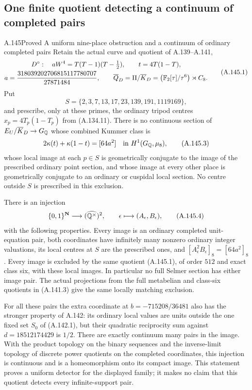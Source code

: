 \subsection{One finite quotient detecting a continuum of completed pairs}

\begin{statement}{A.145}{Proved}
{A uniform nine-place obstruction and a continuum of ordinary completed pairs}
Retain the actual curve and quotient of A.139--A.141,
\[
 \begin{gathered}
 D^\circ:\quad aW^4=T(T-1)(T-\tfrac12),\qquad
 t=4T(1-T),\\
 a=\frac{318039202706815117780707}{27871484},\qquad
 \overline Q_D=\Pi/\overline K_D
       =\bigl(\mathbb F_2[\tau]/\tau^6\bigr)\rtimes C_8.
 \end{gathered}
\tag{A.145.1}
\]
Put
\[
 S=\{2,3,7,13,17,23,139,191,1119169\},
\tag{A.145.2}
\]
and prescribe, only at these primes, the ordinary tripod centres
\(x_p=4T_p(1-T_p)\) from (A.134.11).
There is no continuous section of
\(E_U/\overline K_D\to G_\mathbb Q\) whose combined Kummer class is
\[
              2\kappa(t)+\kappa(1-t)=[64a^2]
                       \quad\text{in }H^1(G_\mathbb Q,\mu_8),
\tag{A.145.3}
\]
whose local image at each \(p\in S\) is geometrically conjugate
to the image of the prescribed ordinary point section, and whose
image at every other place is geometrically conjugate to an
ordinary or cuspidal local section.  No centre outside \(S\)
is prescribed in this exclusion.

There is an injection
\[
 \{0,1\}^{\mathbf N}\longrightarrow
        (\widehat{\mathbb Q^\times})^2,
        \qquad \epsilon\longmapsto(A_\epsilon,B_\epsilon),
\tag{A.145.4}
\]
with the following properties.  Every image is an ordinary
completed unit-equation pair, both coordinates have infinitely
many nonzero ordinary integer valuations, its local centres at
\(S\) are the prescribed ones, and
\([A_\epsilon^2B_\epsilon]_8=[64a^2]_8\).
Every image is excluded by the same quotient (A.145.1), of
order \(512\) and exact class six, with these local images.
In particular no full Selmer section has either image pair.
The actual projections from the full metabelian and class-six
quotients in (A.141.3) give the same locally matching exclusion.

For all these pairs the extra coordinate at
\(b=-715208/36481\) also has the stronger property of A.142:
its ordinary local values are units outside the one fixed set
\(S_0\) of (A.142.1), but their quadratic reciprocity sum
against \(d=18512174429\) is \(1/2\).
There are exactly continuum many pairs in the image.
With the product topology on the binary sequences and the
inverse-limit topology of discrete power quotients on the
completed coordinates, this injection is continuous and is
a homeomorphism onto its compact image.
This statement proves a uniform detector for the displayed
family; it makes no claim that this quotient detects every
infinite-support pair.
\end{statement}

